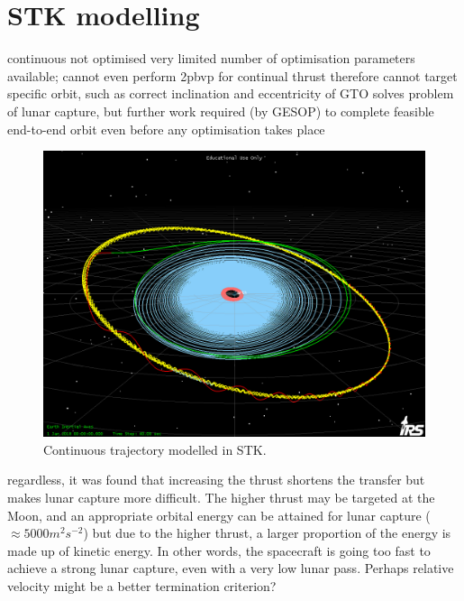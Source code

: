 
\clearpage


\section{STK modelling} \label{sec:STK}

continuous
not optimised
very limited number of optimisation parameters available; cannot even perform 2pbvp for continual thrust
therefore cannot target specific orbit, such as correct inclination and eccentricity of GTO
solves problem of lunar capture, but further work required (by GESOP) to complete feasible end-to-end orbit even before any optimisation takes place

\begin{figure}
\centering
\includegraphics[width=\textwidth]{Images/STK/trajectory1b.png}
\caption{Continuous trajectory modelled in STK.}
\label{fig:STK}
\end{figure}

regardless, it was found that increasing the thrust shortens the transfer but makes lunar capture more difficult. The higher thrust may be targeted at the Moon, and an appropriate orbital energy can be attained for lunar capture ($\approx5000m^2s^{-2}$) but due to the higher thrust, a larger proportion of the energy is made up of kinetic energy. In other words, the spacecraft is going too fast to achieve a strong lunar capture, even with a very low lunar pass. Perhaps relative velocity might be a better termination criterion?

